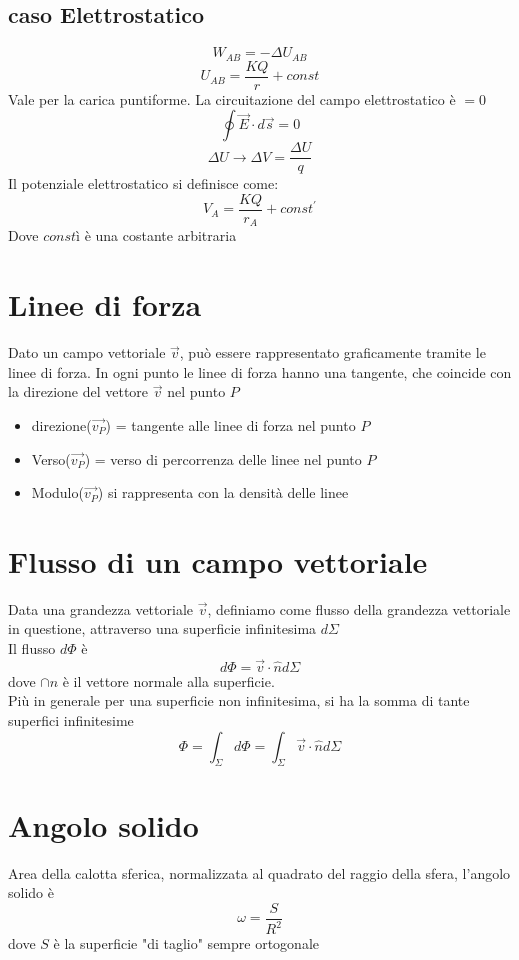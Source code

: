 \documentclass[a4paper]{report}
\begin{document}
  \subsection{caso Elettrostatico}
  \[ W_{AB} = - \Delta U_{AB}\]
  \[ U_{AB} = \frac{KQ}{r} + const \]
  Vale per la carica puntiforme. La circuitazione del campo elettrostatico è $=0$
  \[ \oint \vec{E} \cdot d\vec{s} = 0 \]
  \[ \Delta U \longrightarrow \Delta V = \frac{\Delta U}{q} \]
  Il potenziale elettrostatico si definisce come:
  \[ V_A = \frac{KQ}{r_A} + const^' \]
  Dove $constì$ è una costante arbitraria

  \section{Linee di forza}
  Dato un campo vettoriale $\vec{v}$, può essere rappresentato graficamente tramite le linee di forza. In ogni punto le linee di forza hanno una tangente, che coincide con la direzione del vettore $\vec{v}$ nel punto $P$
  \begin{itemize}
    \item direzione($\vec{v_P}$) = tangente alle linee di forza nel punto $P$
    \item Verso($\vec{v_P}$) = verso di percorrenza delle linee nel punto $P$
    \item Modulo($\vec{v_P}$) si rappresenta con la densità delle linee
  \end{itemize}

  \section{Flusso di un campo vettoriale}
  Data una grandezza vettoriale $\vec{v}$,  definiamo come flusso della grandezza vettoriale in questione, attraverso una superficie infinitesima $d \Sigma$\\
  Il flusso $d \Phi$ è
  \[ d \Phi = \vec{v}\cdot \hat{n} d \Sigma \]
  dove $\cap{n}$ è il vettore normale alla superficie.\\
  Più in generale per una superficie non infinitesima, si ha la somma di tante superfici infinitesime
  \[ \Phi = \int_\Sigma d\Phi = \int_\Sigma \vec{v} \cdot \hat{n} d\Sigma \]

  \section{Angolo solido}
  Area della calotta sferica, normalizzata al quadrato del raggio della sfera, l'angolo solido è
  \[ \omega = \frac{S}{R^2} \]
  dove $S$ è la superficie "di taglio" sempre ortogonale
\end{document}
